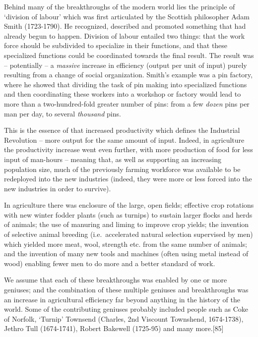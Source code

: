 \documentclass[
]{book}
\begin{document}
Behind many of the breakthroughs of the modern world lies the principle of `division of labour' which was first articulated by the Scottish philosopher Adam Smith (1723-1790). He recognized, described and promoted something that had already begun to happen. Division of labour entailed two things: that the work force should be subdivided to specialize in their functions, and that these specialized functions could be coordinated towards the final result. The result was -- potentially -- a \emph{massive} increase in efficiency (output per unit of input) purely resulting from a change of social organization. Smith's example was a pin factory, where he showed that dividing the task of pin making into specialized functions and then coordinating these workers into a workshop or factory would lead to more than a two-hundred-fold greater number of pins: from a few \emph{dozen} pins per man per day, to several \emph{thousand} pins.

This is the essence of that increased productivity which defines the Industrial Revolution -- more output for the same amount of input. Indeed, in agriculture the productivity increase went even further, with more production of food for less input of man-hours -- meaning that, as well as supporting an increasing population size, much of the previously farming workforce was available to be redeployed into the new industries (indeed, they were more or less forced into the new industries in order to survive).

In agriculture there was enclosure of the large, open fields; effective crop rotations with new winter fodder plants (such as turnips) to sustain larger flocks and herds of animals; the use of manuring and liming to improve crop yields; the invention of selective animal breeding (i.e.~accelerated natural selection supervised by men) which yielded more meat, wool, strength etc. from the same number of animals; and the invention of many new tools and machines (often using metal instead of wood) enabling fewer men to do more and a better standard of work.

We assume that each of these breakthroughs was enabled by one or more geniuses; and the combination of these multiple geniuses and breakthroughs was an increase in agricultural efficiency far beyond anything in the history of the world. Some of the contributing geniuses probably included people such as Coke of Norfolk, `Turnip' Townsend (Charles, 2nd Viscount Townshend, 1674-1738), Jethro Tull (1674-1741), Robert Bakewell (1725-95) and many more.{[}85{]}
\end{document}

